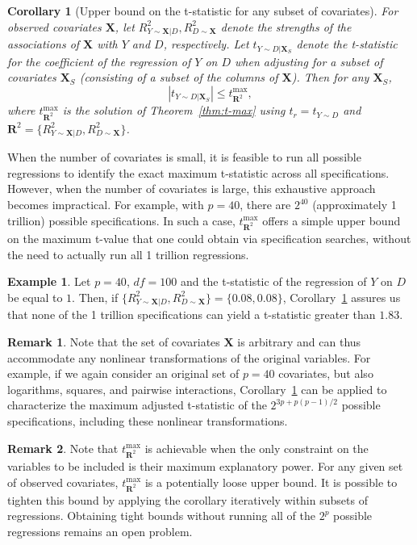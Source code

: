 \documentclass[sts]{imsart}
\theoremstyle{plain}
\newtheorem{corollary}{Corollary}
\theoremstyle{definition}
\newtheorem{remark}{Remark}
\newtheorem{example}{Example}
\newcommand{\df}{df}
\newcommand{\tmax}{t_{\boldsymbol{R}^2}^{\max}}
\newcommand{\R}{\boldsymbol{R}}
\newcommand{\Ryx}{R^2_{Y \sim \mathbf{X}|D}}
\newcommand{\Rdx}{R^2_{D \sim \mathbf{X}}}
\begin{document}
\begin{corollary}[Upper bound on the t-statistic for any subset of covariates] \label{cor-phacking} For observed covariates $\mathbf{X}$, let $\Ryx, \Rdx$ denote
the strengths of the associations of  $\mathbf{X}$ with $Y$ and $D$, respectively. Let $t_{Y\sim D|\mathbf{X}_{S}}$ denote the t-statistic for the coefficient of the regression of $Y$ on $D$ when adjusting for a subset of covariates $\mathbf{X}_{S}$ (consisting of a subset of the columns of $\mathbf{X}$). Then for any $\mathbf{X}_{S}$,
$$
|t_{Y\sim D|\mathbf{X}_{S}}| \leq \tmax,
$$ 
where $\tmax$ is the solution of Theorem~\ref{thm:t-max} using $t_r = t_{Y\sim D}$ and $\R^2 = \{R^2_{Y \sim \mathbf{X}|D}, R^2_{D \sim \mathbf{X}}\}$.
\end{corollary}

When the number of covariates is small, it is feasible to run all possible regressions to identify the exact maximum t-statistic across all specifications. However, when the number of covariates is large, this exhaustive approach becomes impractical. For example, with $p = 40$, there are $2^{40}$ (approximately 1 trillion) possible specifications. {In such a case, $\tmax$ offers a simple upper bound on the maximum t-value that one could obtain via specification searches, without the need to actually run all 1 trillion regressions.}



\begin{example}
    Let $p=40$, $\df=100$ and the t-statistic of the regression of $Y$ on $D$ be equal to $1$.  Then, if $\{R^2_{Y \sim \mathbf{X}|D}, R^2_{D \sim \mathbf{X}}\} = \{0.08, 0.08\}$, Corollary~\ref{cor-phacking} assures us that none of the 1 trillion specifications can yield a t-statistic greater than $1.83$. 
\end{example}

\begin{remark}
    Note that the set of covariates $\mathbf{X}$ is arbitrary and can  thus accommodate any nonlinear transformations of the original variables. For example, if we again consider an original set of $p=40$ covariates, but also logarithms, squares, and pairwise interactions, Corollary~\ref{cor-phacking} can be applied to characterize the maximum adjusted t-statistic of the $2^{3p + p(p-1)/2}$ possible specifications, including these nonlinear transformations.
\end{remark}

\begin{remark}
    Note that $\tmax$ is achievable when the only constraint on the variables to be included is their maximum explanatory power. For any given set of observed covariates, $\tmax$ is a potentially loose upper bound. It is possible to tighten this bound by applying the corollary iteratively within subsets of regressions.
    Obtaining tight bounds without running all of the $2^p$ possible regressions remains an open problem.
\end{remark}  
\end{document}
